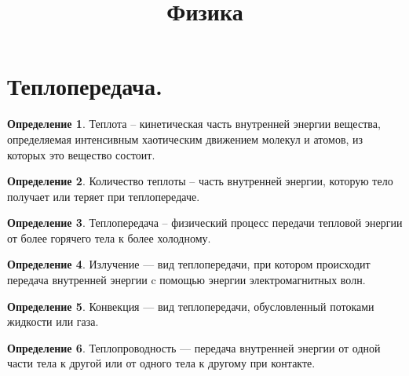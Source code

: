 \documentclass[12pt]{article}
\title{\textbf{Физика}}\date{}
\theoremstyle{definition}
\newtheorem{definition}{Определение}
\begin{document}
\maketitle
\tableofcontents
\label{toc}
\newpage

\section{Теплопередача.}

\begin{definition}
    Теплота – кинетическая часть внутренней энергии вещества, определяемая интенсивным хаотическим движением молекул и атомов, из которых это вещество состоит.
\end{definition}
\begin{definition}
    Количество теплоты – часть внутренней энергии, которую тело получает или теряет при теплопередаче.
\end{definition}
\begin{definition}
    Теплопередача – физический процесс передачи тепловой энергии от более горячего тела к более холодному.
\end{definition}

\begin{center}
\end{center}

\begin{definition}
    Излучение — вид теплопередачи, при котором происходит передача внутренней энергии c помощью энергии электромагнитных волн.
\end{definition}
\begin{definition}
    Конвекция — вид теплопередачи, обусловленный потоками жидкости или газа.
\end{definition}
\begin{definition}
    Теплопроводность — передача внутренней энергии от одной части тела к другой или от одного тела к другому при контакте.
\end{definition}
\end{document}
